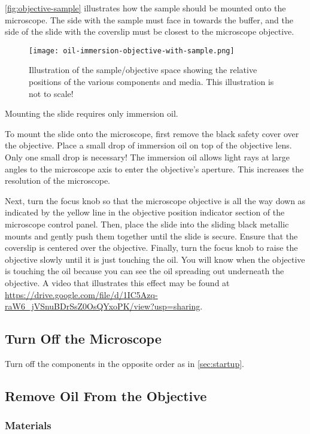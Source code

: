 \documentclass[10pt,a4paper,oneside]{book}
\begin{document}
\autoref{fig:objective-sample} illustrates how the sample should be mounted onto the microscope. The side with the sample must face in towards the buffer, and the side of the slide with the coverslip must be closest to the microscope objective.

\begin{figure}[ht]
    \centering
    \texttt{[image: oil-immersion-objective-with-sample.png]}
    \caption{Illustration of the sample/objective space showing the relative positions of the various components and media. This illustration is not to scale!}
    \label{fig:objective-sample}
\end{figure}

Mounting the slide requires only immersion oil.

To mount the slide onto the microscope, first remove the black safety cover over the objective. Place a small drop of immersion oil on top of the objective lens. Only one small drop is necessary! The immersion oil allows light rays at large angles to the microscope axis to enter the objective's aperture. This increases the resolution of the microscope.

Next, turn the focus knob so that the microscope objective is all the way down as indicated by the yellow line in the objective position indicator section of the microscope control panel. Then, place the slide into the sliding black metallic mounts and gently push them together until the slide is secure. Ensure that the coverslip is centered over the objective. Finally, turn the focus knob to raise the objective slowly until it is just touching the oil. You will know when the objective is touching the oil because you can see the oil spreading out underneath the objective. A video that illustrates this effect may be found at \url{https://drive.google.com/file/d/1IC5Azq-raW6_jVSnuBDrSsZ0OsQYxoPK/view?usp=sharing}.

\subsection{Turn Off the Microscope}

Turn off the components in the opposite order as in \autoref{sec:startup}.

\subsection{Remove Oil From the Objective}\label{sec:remove-oil}

\subsubsection{Materials}
\end{document}
